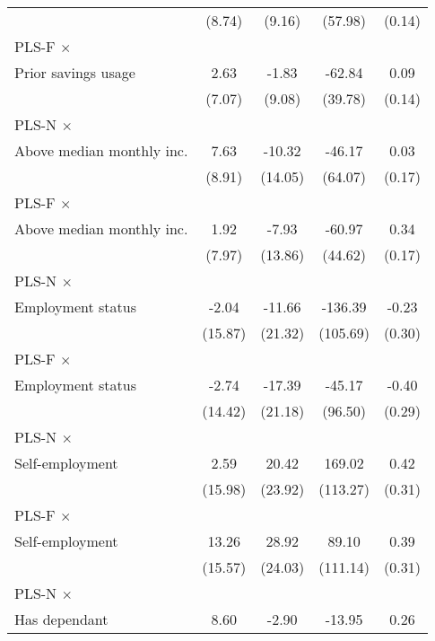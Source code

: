 \begin{table}[htbp]
\begin{tabular}{l*{4}{c}}
                &   (8.74)         &   (9.16)         &  (57.98)         &   (0.14)         \\
\addlinespace
PLS-F $\times$ \\ Prior savings usage&     2.63         &    -1.83         &   -62.84         &     0.09         \\
                &   (7.07)         &   (9.08)         &  (39.78)         &   (0.14)         \\
\addlinespace
PLS-N $\times$ \\ Above median monthly inc.&     7.63         &   -10.32         &   -46.17         &     0.03         \\
                &   (8.91)         &  (14.05)         &  (64.07)         &   (0.17)         \\
\addlinespace
PLS-F $\times$ \\ Above median monthly inc.&     1.92         &    -7.93         &   -60.97         &     0.34\sym{**} \\
                &   (7.97)         &  (13.86)         &  (44.62)         &   (0.17)         \\
\addlinespace
PLS-N $\times$ \\ Employment status&    -2.04         &   -11.66         &  -136.39         &    -0.23         \\
                &  (15.87)         &  (21.32)         & (105.69)         &   (0.30)         \\
\addlinespace
PLS-F $\times$ \\ Employment status&    -2.74         &   -17.39         &   -45.17         &    -0.40         \\
                &  (14.42)         &  (21.18)         &  (96.50)         &   (0.29)         \\
\addlinespace
PLS-N $\times$ \\ Self-employment&     2.59         &    20.42         &   169.02         &     0.42         \\
                &  (15.98)         &  (23.92)         & (113.27)         &   (0.31)         \\
\addlinespace
PLS-F $\times$ \\ Self-employment&    13.26         &    28.92         &    89.10         &     0.39         \\
                &  (15.57)         &  (24.03)         & (111.14)         &   (0.31)         \\
\addlinespace
PLS-N $\times$ \\ Has dependant&     8.60         &    -2.90         &   -13.95         &     0.26         \\

\end{tabular}
\end{table}
